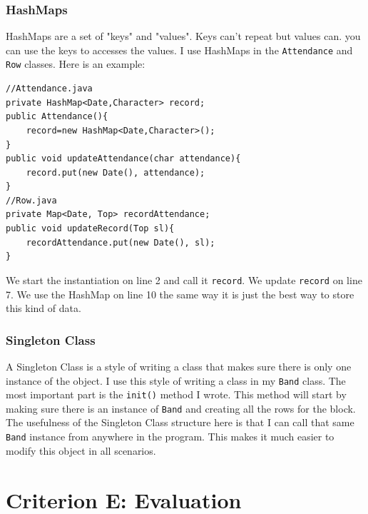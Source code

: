\documentclass{article}
\begin{document}
\subsubsection{HashMaps}
HashMaps are a set of "keys" and "values". Keys can't repeat but values can. you can use the keys to accesses the values. I use HashMaps in the \verb|Attendance| and \verb|Row| classes. Here is an example:
\begin{lstlisting}
//Attendance.java
private HashMap<Date,Character> record;
public Attendance(){
	record=new HashMap<Date,Character>();
}
public void updateAttendance(char attendance){
	record.put(new Date(), attendance);
}
//Row.java
private Map<Date, Top> recordAttendance;
public void updateRecord(Top sl){
	recordAttendance.put(new Date(), sl);
}
\end{lstlisting}
We start the instantiation on line 2 and call it \verb|record|. We update \verb|record| on line 7. We use the HashMap on line 10 the same way it is just the best way to store this kind of data.
\subsubsection{Singleton Class}
A Singleton Class is a style of writing a class that makes sure there is only one instance of the object. I use this style of writing a class in my \verb|Band| class. The most important part is the \verb|init()| method I wrote. This method will start by making sure there is an instance of \verb|Band| and creating all the rows for the block. The usefulness of the Singleton Class structure here is that I can call that same \verb|Band| instance from anywhere in the program. This makes it much easier to modify this object in all scenarios.
\newpage
\section{Criterion E: Evaluation}
\end{document}
